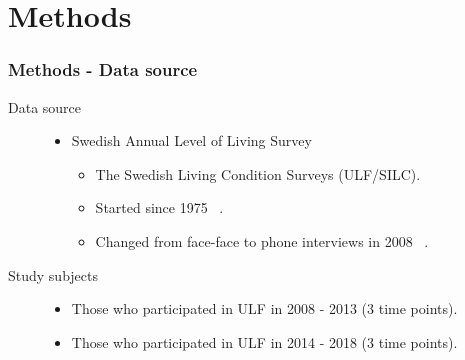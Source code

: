 \documentclass[dvipdfmx]{beamer}\usepackage[]{graphicx}\usepackage[]{color}
\begin{document}
\section{Methods}
\begin{frame}
	\frametitle{Methods - Data source}
	\begin{description}
		\item[Data source] \mbox{}\par
			\begin{itemize} 
				\item Swedish Annual Level of Living Survey
					\begin{itemize}
						\item The Swedish Living Condition Surveys (ULF/SILC).
						\item Started since 1975 ~.
						\item Changed from face-face to phone interviews in 2008 ~.
					\end{itemize} 
			\end{itemize} 
		\item[Study subjects] \mbox{}\par
			\begin{itemize} 
				\item Those who participated in ULF in 2008 - 2013 (3 time points).
				\item Those who participated in ULF in 2014 - 2018 (3 time points).
			\end{itemize} 
	\end{description}

\end{frame}
\end{document}

